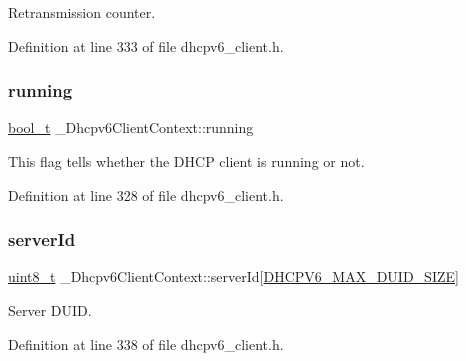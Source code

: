 Retransmission counter. 



Definition at line 333 of file dhcpv6\+\_\+client.\+h.

\mbox{\label{struct__Dhcpv6ClientContext_acf9afe26f2d131279a3800ed41e57eff}} 
\subsubsection{\texorpdfstring{running}{running}}
{\footnotesize\ttfamily \hyperlink{compiler__port_8h_a812d16e5494522586b3784e55d479912}{bool\+\_\+t} \+\_\+\+Dhcpv6\+Client\+Context\+::running}



This flag tells whether the D\+H\+CP client is running or not. 



Definition at line 328 of file dhcpv6\+\_\+client.\+h.

\mbox{\label{struct__Dhcpv6ClientContext_a3862d9f92229ce6ae40edba070cb3633}} 
\subsubsection{\texorpdfstring{server\+Id}{serverId}}
{\footnotesize\ttfamily \hyperlink{stdint_8h_aba7bc1797add20fe3efdf37ced1182c5}{uint8\+\_\+t} \+\_\+\+Dhcpv6\+Client\+Context\+::server\+Id\mbox{[}\hyperlink{dhcpv6__common_8h_aa05ad3ad9a83e2486fbb7f86838fffb9}{D\+H\+C\+P\+V6\+\_\+\+M\+A\+X\+\_\+\+D\+U\+I\+D\+\_\+\+S\+I\+ZE}\mbox{]}}



Server D\+U\+ID. 



Definition at line 338 of file dhcpv6\+\_\+client.\+h.

\mbox{\label{struct__Dhcpv6ClientContext_aa6e5c000d1e73010064b6f8b4b33879e}} 
